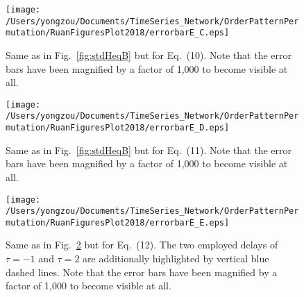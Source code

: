 \documentclass[aps,chaos,superscriptaddress,showkeys]{revtex4}
\begin{document}
\begin{figure}
	\centering
	\texttt{[image: /Users/yongzou/Documents/TimeSeries\_Network/OrderPatternPermutation/RuanFiguresPlot2018/errorbarE\_C.eps]}
\caption{Same as in Fig.~\ref{fig:stdHeqB} but for Eq.~(10). Note that the error bars have been magnified by a factor of 1,000 to become visible at all.\label{fig:stdHeqC}}
\end{figure}

\begin{figure}
	\centering
	\texttt{[image: /Users/yongzou/Documents/TimeSeries\_Network/OrderPatternPermutation/RuanFiguresPlot2018/errorbarE\_D.eps]}
\caption{Same as in Fig.~\ref{fig:stdHeqB} but for Eq.~(11).  Note that the error bars have been magnified by a factor of 1,000 to become visible at all.\label{fig:stdHeqD}}
\end{figure}

\begin{figure}
	\centering
	\texttt{[image: /Users/yongzou/Documents/TimeSeries\_Network/OrderPatternPermutation/RuanFiguresPlot2018/errorbarE\_E.eps]}
\caption{Same as in Fig.~\ref{fig:stdHeqD} but for Eq.~(12). The two employed delays of $\tau = -1$ and $\tau = 2$ are additionally highlighted by vertical blue dashed lines. Note that the error bars have been magnified by a factor of 1,000 to become visible at all.\label{fig:stdHeqE}}
\end{figure}



\end{document}
